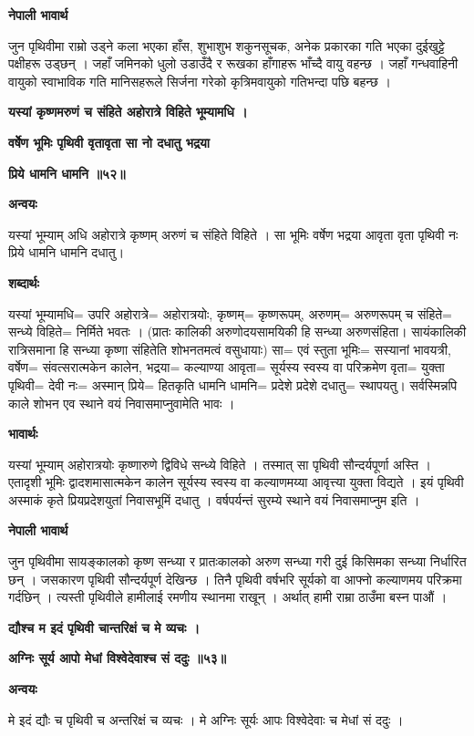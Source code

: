 \documentclass[11pt, a5paper]{article}
\begin{document}
\textbf{नेपाली भावार्थ}

जुन पृथिवीमा राम्रो उड्ने कला भएका हाँस, शुभाशुभ शकुनसूचक, अनेक प्रकारका गति भएका दुईखुट्टे पक्षीहरू उड्छन् । जहाँ जमिनको धुलो उडाउँदै र रूखका हाँगाहरू भाँच्दै वायु वहन्छ । जहाँ गन्धवाहिनी वायुको स्वाभाविक गति मानिसहरूले सिर्जना गरेको कृत्रिमवायुको गतिभन्दा पछि बहन्छ ।

\textbf{यस्यां कृष्णमरुणं च संहिते अहोरात्रे विहिते भूम्यामधि ।}

\textbf{वर्षेेण भूमिः पृथिवी वृतावृता सा नो दधातु भद्रया}

\textbf{प्रिये धामनि धामनि ॥५२॥}

\textbf{अन्वयः}

यस्यां भूम्याम् अधि अहोरात्रे कृष्णम् अरुणं च संहिते विहिते । सा भूमिः वर्षेण भद्रया आवृता वृता पृथिवी नः प्रिये धामनि धामनि दधातु।

\textbf{शब्दार्थः}

यस्यां भूम्यामधि= उपरि अहोरात्रे= अहोरात्रयोः, कृष्णम्= कृष्णरूपम्, अरुणम्= अरुणरूपम् च संहिते= सन्ध्ये विहिते= निर्मिते भवतः । (प्रातः कालिकी अरुणोदयसामयिकी हि सन्ध्या अरुणसंहिता। सायंकालिकी रात्रिसमाना हि सन्ध्या कृष्णा संहितेति शोभनतमत्वं वसुधायाः) सा= एवं स्तुता भूमिः= सस्यानां भावयत्री, वर्षेण= संवत्सरात्मकेन कालेन, भद्रया= कल्याण्या आवृता= सूर्यस्य स्वस्य वा परिक्रमेण वृता= युक्ता पृथिवी= देवी नः= अस्मान् प्रिये= हितकृति धामनि धामनि= प्रदेशे प्रदेशे दधातु= स्थापयतु। सर्वस्मिन्नपि काले शोभन एव स्थाने वयं निवासमाप्नुवामेति भावः ।

\textbf{भावार्थः}

यस्यां भूम्याम् अहोरात्रयोः कृष्णारुणे द्विविधे सन्ध्ये विहिते । तस्मात् सा पृथिवी सौन्दर्यपूर्णा अस्ति । एतादृशी भूमिः द्वादशमासात्मकेन कालेन सूर्यस्य स्वस्य वा कल्याणमय्या आवृत्त्या युक्ता विद्यते । इयं पृथिवी अस्माकं कृते प्रियप्रदेशयुतां निवासभूमिं दधातु । वर्षपर्यन्तं सुरम्ये स्थाने वयं निवासमाप्नुम इति ।

\textbf{नेपाली भावार्थ}

जुन पृथिवीमा सायङ्‌कालको कृष्ण सन्ध्या र प्रातःकालको अरुण सन्ध्या गरी दुई किसिमका सन्ध्या निर्धारित छन् । जसकारण पृथिवी सौन्दर्यपूर्ण देखिन्छ । तिनै पृथिवी वर्षभरि सूर्यको वा आफ्नो कल्याणमय परिक्रमा गर्दछिन् । त्यस्ती पृथिवीले हामीलाई रमणीय स्थानमा राखून् । अर्थात् हामी राम्रा ठाउँमा बस्न पाऔं ।

\textbf{द्यौश्च म इदं पृथिवी चान्तरिक्षं च मे व्यचः ।}

\textbf{अग्निः सूर्य आपो मेधां विश्वेदेवाश्च सं ददुः ॥५३॥}

\textbf{अन्वयः}

मे इदं द्यौः च पृथिवी च अन्तरिक्षं च व्यचः । मे अग्निः सूर्यः आपः विश्वेदेवाः च मेधां सं ददुः ।
\end{document}
